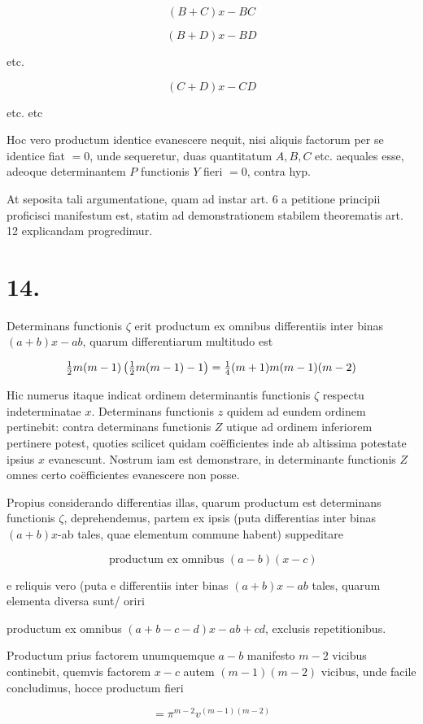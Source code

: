 \documentclass[twoside,12pt, showframe]{memoir}
\let\oldfrac\frac
\def\frac#1#2{\mathchoice{\tfrac{#1}{#2}}{\oldfrac{#1}{#2}}{\genfrac{}{}{}{2}{#1}{#2\mathstrut}}{\genfrac{}{}{}{3}{#1}{#2\mathstrut}}}
\begin{document}
\[
(B+C) x-B C
\]

\[
(B+D) x-B D
\]

etc.

\[
(C+D) x-C D
\]

etc. etc

Hoc vero productum identice evanescere nequit, nisi aliquis factorum per se identice fiat \(=0\), unde sequeretur, duas quantitatum \(A, B, C\) etc. aequales esse, adeoque determinantem \(P\) functionis \(Y\) fieri \(=0\), contra hyp.

At seposita tali argumentatione, quam ad instar art. 6 a petitione principii proficisci manifestum est, statim ad demonstrationem stabilem theorematis art. 12 explicandam progredimur.

\section*{14.}
Determinans functionis \(\zeta\) erit productum ex omnibus differentiis inter binas \((a+b) x-a b\), quarum differentiarum multitudo est

\[
\frac{1}{2} m(m-1)\left(\frac{1}{2} m(m-1)-1\right)=\frac{1}{4}(m+1) m(m-1)(m-2)
\]

Hic numerus itaque indicat ordinem determinantis functionis \(\zeta\) respectu indeterminatae \(x\). Determinans functionis \(z\) quidem ad eundem ordinem pertinebit: contra determinans functionis \(Z\) utique ad ordinem inferiorem pertinere potest, quoties scilicet quidam coëfficientes inde ab altissima potestate ipsius \(x\) evanescunt. Nostrum iam est demonstrare, in determinante functionis \(Z\) omnes certo coëfficientes evanescere non posse.

Propius considerando differentias illas, quarum productum est determinans functionis \(\zeta\), deprehendemus, partem ex ipsis (puta differentias inter binas \((a+b) x\)-ab tales, quae elementum commune habent) suppeditare

\[
\text { productum ex omnibus }(a-b)(x-c)
\]

e reliquis vero (puta e differentiis inter binas \((a+b) x-a b\) tales, quarum elementa diversa sunt/ oriri

productum ex omnibus \((a+b-c-d) x-a b+c d\), exclusis repetitionibus.

Productum prius factorem unumquemque \(a-b\) manifesto \(m-2\) vicibus continebit, quemvis factorem \(x-c\) autem \((m-1)(m-2)\) vicibus, unde facile concludimus, hocce productum fieri

\[
=\pi^{m-2} v^{(m-1)(m-2)}
\]
\end{document}
